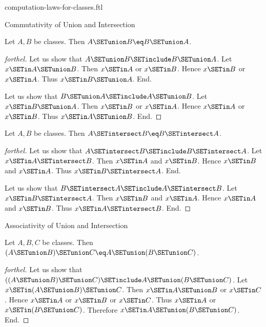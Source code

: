 \documentclass{stex}
\begin{document}
\begin{smodule}{computation-laws-for-classes.ftl}

\begin{sfragment}{Commutativity of Union and Intersection}
  \begin{proposition}[forthel,id=FOUNDATIONS_02_8446177632583680]
    Let $A, B$ be classes.
    Then $A \SETunion B \eq B \SETunion A$.
  \end{proposition}
  \begin{proof}[forthel]
    Let us show that $A \SETunion B \SETinclude B \SETunion A$.
      Let $x \SETin A \SETunion B$.
      Then $x \SETin A$ or $x \SETin B$.
      Hence $x \SETin B$ or $x \SETin A$.
      Thus $x \SETin B \SETunion A$.
    End.

    Let us show that $B \SETunion A \SETinclude A \SETunion B$.
      Let $x \SETin B \SETunion A$.
      Then $x \SETin B$ or $x \SETin A$.
      Hence $x \SETin A$ or $x \SETin B$.
      Thus $x \SETin A \SETunion B$.
    End.
  \end{proof}

  \begin{proposition}[forthel,id=FOUNDATIONS_02_7565102251245568]
    Let $A, B$ be classes.
    Then $A \SETintersect B \eq B \SETintersect A$.
  \end{proposition}
  \begin{proof}[forthel]
    Let us show that $A \SETintersect B \SETinclude B \SETintersect A$.
      Let $x \SETin A \SETintersect B$.
      Then $x \SETin A$ and $x \SETin B$.
      Hence $x \SETin B$ and $x \SETin A$.
      Thus $x \SETin B \SETintersect A$.
    End.

    Let us show that $B \SETintersect A \SETinclude A \SETintersect B$.
      Let $x \SETin B \SETintersect A$.
      Then $x \SETin B$ and $x \SETin A$.
      Hence $x \SETin A$ and $x \SETin B$.
      Thus $x \SETin A \SETintersect B$.
    End.
  \end{proof}
\end{sfragment}

\begin{sfragment}{Associativity of Union and Intersection}
  \begin{proposition}[forthel,id=FOUNDATIONS_02_3854032263184384]
    Let $A, B, C$ be classes.
    Then $(A \SETunion B) \SETunion C \eq A \SETunion (B \SETunion C)$.
  \end{proposition}
  \begin{proof}[forthel]
    Let us show that $((A \SETunion B) \SETunion C) \SETinclude A \SETunion (B \SETunion C)$. %
      Let $x \SETin (A \SETunion B) \SETunion C$.
      Then $x \SETin A \SETunion B$ or $x \SETin C$.
      Hence $x \SETin A$ or $x \SETin B$ or $x \SETin C$.
      Thus $x \SETin A$ or $x \SETin (B \SETunion C)$.
      Therefore $x \SETin A \SETunion (B \SETunion C)$.
    End.


\end{proof}
\end{sfragment}
\end{smodule}
\end{document}
